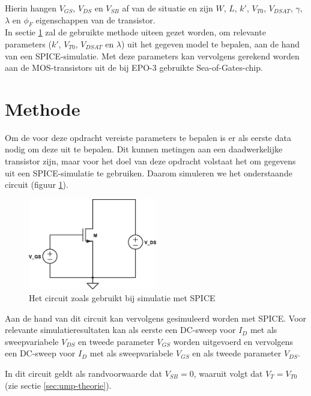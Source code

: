 \documentclass{article}
\begin{document}
Hierin hangen $V_{GS}$, $V_{DS}$ en $V_{SB}$ af van de situatie en zijn $W$, $L$, $k'$, $V_{T0}$, $V_{DSAT}$, $\gamma$, $\lambda$ en $\phi_{F}$ eigenschappen van de transistor.
\\

In sectie \ref{sec:ump-methode} zal de gebruikte methode uiteen gezet worden, om relevante parameters ($k'$, $V_{T0}$, $V_{DSAT}$ en $\lambda$) uit het gegeven model te bepalen, aan de hand van een SPICE-simulatie. Met deze parameters kan vervolgens gerekend worden aan de MOS-transistors uit de bij EPO-3 gebruikte Sea-of-Gates-chip.

\section{Methode}
\label{sec:ump-methode}

Om de voor deze opdracht vereiste parameters te bepalen is er als eerste data nodig om deze uit te bepalen. Dit kunnen metingen aan een daadwerkelijke transistor zijn, maar voor het doel van deze opdracht volstaat het om gegevens uit een SPICE-simulatie te gebruiken. Daarom simuleren we het onderstaande circuit (figuur \ref{fig:ump-sim-circuit}).

\begin{figure}[h]
	\centering
	\includegraphics[width=0.5\textwidth]{resource/sim-circuit}
	\caption{Het circuit zoals gebruikt bij simulatie met SPICE}
	\label{fig:ump-sim-circuit}
\end{figure}

Aan de hand van dit circuit kan vervolgens gesimuleerd worden met SPICE. Voor relevante simulatieresultaten kan als eerste een DC-sweep voor $I_{D}$ met als sweepvariabele $V_{DS}$ en tweede parameter $V_{GS}$ worden uitgevoerd en vervolgens een DC-sweep voor $I_{D}$ met als sweepvariabele $V_{GS}$ en als tweede parameter $V_{DS}$.

In dit circuit geldt als randvoorwaarde dat $V_{SB} = 0$, waaruit volgt dat $V_{T} = V_{T0}$ (zie sectie \ref{sec:ump-theorie}).
\end{document}
